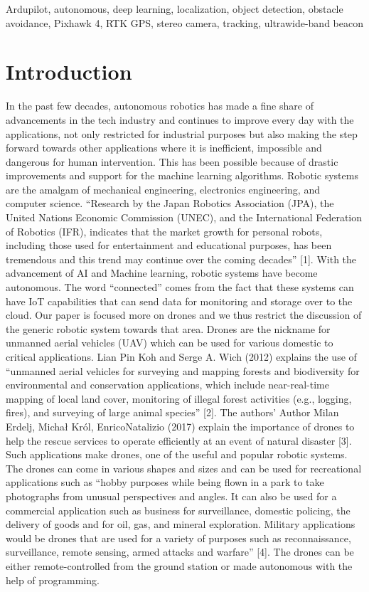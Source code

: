 \documentclass{IEEEtran}
\begin{document}
\begin{IEEEkeywords}
Ardupilot, autonomous, deep learning, localization, object detection, obstacle avoidance, Pixhawk 4, RTK GPS, stereo camera, tracking, ultrawide-band beacon
\end{IEEEkeywords}



\IEEEpeerreviewmaketitle



\section{Introduction}\label{sec:introduction}
In the past few decades, autonomous robotics has made a fine share of advancements in the tech industry and continues to improve every day with the applications, not only restricted for industrial purposes but also making the step forward towards other applications where it is inefficient, impossible and dangerous for human intervention. This has been possible because of drastic improvements and support for the machine learning algorithms. Robotic systems are the amalgam of mechanical engineering, electronics engineering, and computer science. “Research by the Japan Robotics Association (JPA), the United Nations Economic Commission (UNEC), and the International Federation of Robotics (IFR), indicates that the market growth for personal robots, including those used for entertainment and educational purposes, has been tremendous and this trend may continue over the coming decades” [1]. With the advancement of AI and Machine learning, robotic systems have become autonomous. The word “connected” comes from the fact that these systems can have IoT capabilities that can send data for monitoring and storage over to the cloud. Our paper is focused more on drones and we thus restrict the discussion of the generic robotic system towards that area.
\newline Drones are the nickname for unmanned aerial vehicles (UAV) which can be used for various domestic to critical applications. Lian Pin Koh and Serge A. Wich (2012) explains the use of “unmanned aerial vehicles for surveying and mapping forests and biodiversity for environmental and conservation applications, which include near-real-time mapping of local land cover, monitoring of illegal forest activities (e.g., logging, fires), and surveying of large animal species” [2]. The authors' Author Milan Erdelj, Michał Król, EnricoNatalizio (2017) explain the importance of drones to help the rescue services to operate efficiently at an event of natural disaster [3]. Such applications make drones, one of the useful and popular robotic systems. The drones can come in various shapes and sizes and can be used for recreational applications such as “hobby purposes while being flown in a park to take photographs from unusual perspectives and angles. It can also be used for a commercial application such as business for surveillance, domestic policing, the delivery of goods and for oil, gas, and mineral exploration. Military applications would be drones that are used for a variety of purposes such as reconnaissance, surveillance, remote sensing, armed attacks and warfare” [4]. The drones can be either remote-controlled from the ground station or made autonomous with the help of programming.
\end{document}
